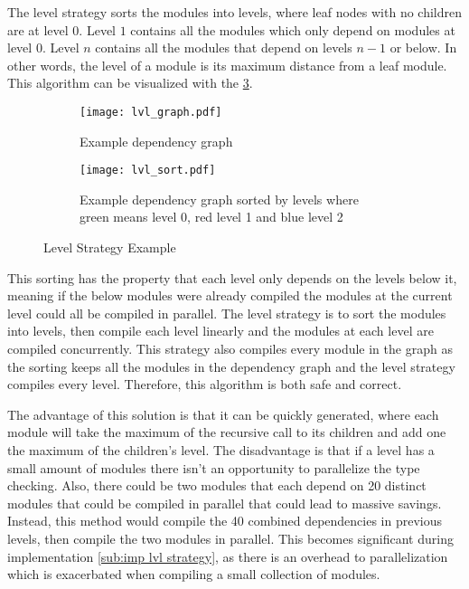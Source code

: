 The level strategy sorts the modules into levels, where leaf nodes with no
children are at level \(0\). Level \(1\) contains all the modules which only depend on
modules at level \(0\). Level \(n\) contains all the modules that depend on levels \(n
- 1\) or below. In other words, the level of a module is its maximum distance
from a leaf module. This algorithm can be visualized with the \cref{subfig: lvl strat}.
\begin{figure}[H]
  \begin{subfigure}[t]{0.45\textwidth}
    \centering
    \texttt{[image: lvl\_graph.pdf]}
    \caption{Example dependency graph}
    \label{fig:example lvl dep graph}
  \end{subfigure} \hfill
  \begin{subfigure}[t]{0.45\textwidth}
    \centering
    \texttt{[image: lvl\_sort.pdf]}
    \caption{Example dependency graph sorted by levels where green means level
    0, red level 1 and blue level 2}
    \label{fig:example lvl sort}
  \end{subfigure}
  \caption{Level Strategy Example}
  \label{subfig: lvl strat}
\end{figure}

This sorting has the property that each level only depends on the levels
below it, meaning if the below modules were already compiled the modules at the
current level could all be compiled in parallel. The level strategy is to sort
the modules into levels, then compile each level linearly and the modules at
each level are compiled concurrently. This strategy also compiles every module
in the graph as the sorting keeps all the modules in the dependency graph and
the level strategy compiles every level. Therefore, this algorithm is both safe
and correct.

The advantage of this solution is that it can be quickly generated,
where each module will take the maximum of the recursive call to its children
and add one the maximum of the children's level. The disadvantage is that if a
level has a small amount of modules there isn't an opportunity to
parallelize the type checking. Also, there could be two modules that each
depend  on 20 distinct modules that could be compiled in parallel that could
lead to massive savings. Instead, this method would compile the 40 combined
dependencies in previous levels, then compile the two modules in parallel. This
becomes significant during implementation \cref{sub:imp lvl strategy}, as there
is an overhead to parallelization which is exacerbated when compiling a small
collection of modules.



